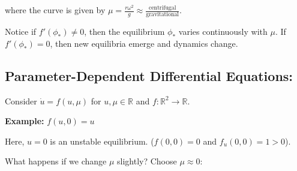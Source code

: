 \documentclass[12pt]{report}
\newcommand{\R}{\mathbb{R}}
\newcommand*{\tbf}[1]{\ifmmode\mathbf{#1}\else\textbf{#1}\fi}
\begin{document}
where the curve is given by $\mu = \frac{r\omega^2}{g} \approx \frac{\text{centrifugal}}{\text{gravitational}}$.

Notice if $f'(\phi_*) \neq 0$, then the equilibrium $\phi_*$ varies continuously with $\mu$. If $f'(\phi_*) =0$, then new equilibria emerge and dynamics change.

\subsection*{Parameter-Dependent Differential Equations:} Consider $\dot u = f(u, \mu)$ for $u, \mu \in \R$ and $f: \R^2 \to \R$.

\tbf{Example:} $f(u, 0) = u$
\begin{center}
\end{center}

Here, $u = 0$ is an unstable equilibrium. ($f(0, 0) =0$ and $f_u(0, 0) = 1 > 0$).

What happens if we change $\mu$ slightly? Choose $\mu \approx 0$:
\end{document}
